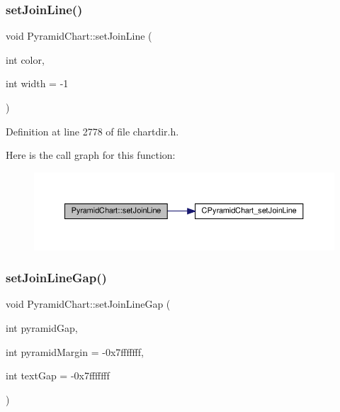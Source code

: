 \subsubsection{\texorpdfstring{set\+Join\+Line()}{setJoinLine()}}
{\footnotesize\ttfamily void Pyramid\+Chart\+::set\+Join\+Line (\begin{DoxyParamCaption}\item[{int}]{color,  }\item[{int}]{width = {\ttfamily -\/1} }\end{DoxyParamCaption})\hspace{0.3cm}{\ttfamily [inline]}}



Definition at line 2778 of file chartdir.\+h.

Here is the call graph for this function\+:
\nopagebreak
\begin{figure}[H]
\begin{center}
\leavevmode
\includegraphics[width=350pt]{class_pyramid_chart_a61749b6cd05b439b66a00afe9ecca570_cgraph}
\end{center}
\end{figure}
\mbox{\label{class_pyramid_chart_a62eee50bacc01aad83f2eee46817d2e4}} 
\subsubsection{\texorpdfstring{set\+Join\+Line\+Gap()}{setJoinLineGap()}}
{\footnotesize\ttfamily void Pyramid\+Chart\+::set\+Join\+Line\+Gap (\begin{DoxyParamCaption}\item[{int}]{pyramid\+Gap,  }\item[{int}]{pyramid\+Margin = {\ttfamily -\/0x7fffffff},  }\item[{int}]{text\+Gap = {\ttfamily -\/0x7fffffff} }\end{DoxyParamCaption})\hspace{0.3cm}{\ttfamily [inline]}}



